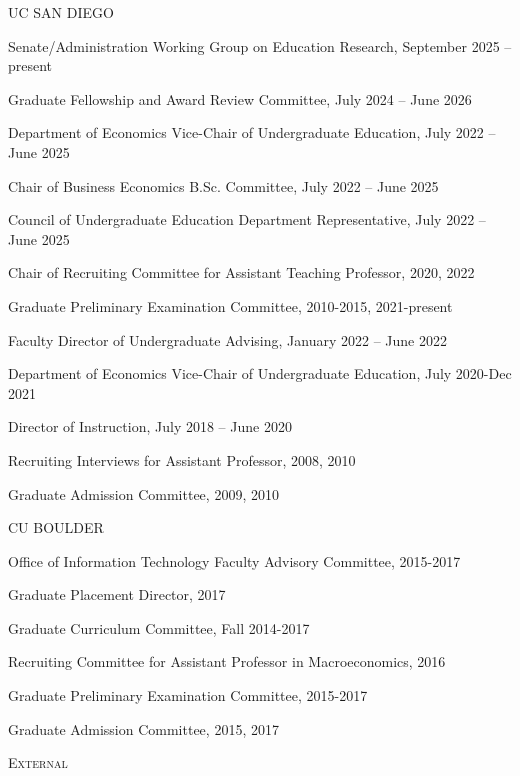 \documentclass[12pt,letterpaper]{article}
\newcommand{\cvblank}{\par\vspace{11pt}}
\newcommand{\cvsubsection}[2][0.125in]{%
  \par\Needspace{4\baselineskip}%
  {\leftskip=#1\relax\scshape #2\par}\nobreak}
\newcommand{\cvschool}[2][0pt]{%
  \par\Needspace{4\baselineskip}%
  {\leftskip=#1\relax #2\par}\nobreak}
\newcommand{\cvtext}[2][0pt]{%
  \par\begingroup\raggedright\leftskip=#1\relax\noindent #2\par\endgroup}
\begin{document}
\cvblank

\cvschool[0.2in]{UC S{\fontsize{10}{13.8}\selectfont AN }D{\fontsize{10}{13.8}\selectfont IEGO}}

\cvtext[0.2in]{Senate/Administration Working Group on Education Research, September 2025 -- present}

\cvtext[0.2in]{Graduate Fellowship and Award Review Committee, July 2024 -- June 2026}

\cvtext[0.2in]{Department of Economics Vice-Chair of Undergraduate Education, July 2022 -- June 2025}

\cvtext[0.2in]{Chair of Business Economics B.Sc. Committee, July 2022 -- June 2025}

\cvtext[0.2in]{Council of Undergraduate Education Department Representative, July 2022 -- June 2025}

\cvtext[0.2in]{Chair of Recruiting Committee for Assistant Teaching Professor, 2020, 2022}

\cvtext[0.2in]{Graduate Preliminary Examination Committee, 2010-2015, 2021-present}

\cvtext[0.2in]{Faculty Director of Undergraduate Advising, January 2022 -- June 2022}

\cvtext[0.2in]{Department of Economics Vice-Chair of Undergraduate Education, July 2020-Dec 2021}

\cvtext[0.2in]{Director of Instruction, July 2018 -- June 2020}

\cvtext[0.2in]{Recruiting Interviews for Assistant Professor, 2008, 2010}

\cvtext[0.2in]{Graduate Admission Committee, 2009, 2010}

\cvblank

\cvschool[0.2in]{CU B{\fontsize{10}{13.8}\selectfont OULDER}}

\cvtext[0.2in]{Office of Information Technology Faculty Advisory Committee, 2015-2017}

\cvtext[0.2in]{Graduate Placement Director, 2017}

\cvtext[0.2in]{Graduate Curriculum Committee, Fall 2014-2017}

\cvtext[0.2in]{Recruiting Committee for Assistant Professor in Macroeconomics, 2016}

\cvtext[0.2in]{Graduate Preliminary Examination Committee, 2015-2017}

\cvtext[0.2in]{Graduate Admission Committee, 2015, 2017}

\cvblank

\cvsubsection[0.125in]{External}
\end{document}
